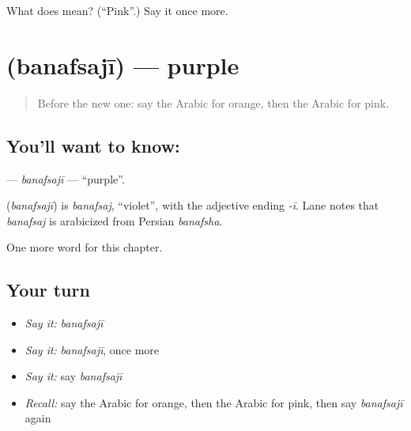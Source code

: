 \begin{tcolorbox}[breakable,colback=teal!4,colframe=teal!35!black,title={Before you move on}]
What does  mean? (\textquotedblleft{}Pink\textquotedblright{}.) Say it once more.
\end{tcolorbox}
\section[\texorpdfstring{\ar{بنفسجي} (banafsajī)}{بنفسجي (banafsajī)}]{ (banafsajī) — purple}

\label{lesson:AR-C271-banafsaji}



\begin{quote}
Before the new one: say the Arabic for orange, then the Arabic for pink.
\end{quote}

\subsection*{You'll want to know: }
\textbf{} — \emph{banafsajī} — \textquotedblleft{}purple\textquotedblright{}.

\begin{cousinweb}
\textbf{} (\emph{banafsajī}) is \emph{banafsaj}, \textquotedblleft{}violet\textquotedblright{}, with the adjective ending \emph{-ī}. Lane notes that \emph{banafsaj} is arabicized from Persian \emph{banafsha}.
\end{cousinweb}

\begin{grammarlens}[title={What you've built}]
One more word for this chapter.
\end{grammarlens}

\subsection*{Your turn}
\begin{itemize}
\raggedright
  \item \emph{Say it:} \emph{banafsajī}
  \item \emph{Say it:} \emph{banafsajī}, once more
  \item \emph{Say it:} say \emph{banafsajī}
  \item \emph{Recall:} say the Arabic for orange, then the Arabic for pink, then say \emph{banafsajī} again
\end{itemize}

